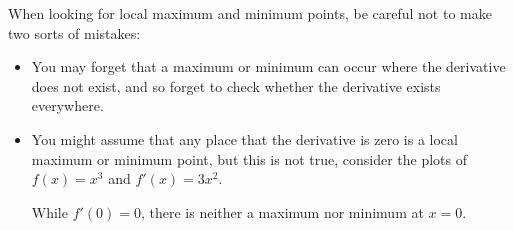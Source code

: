 \documentclass{ximera}
\begin{document}
\begin{warning} 
When looking for local maximum and minimum points, be careful not to
make two sorts of mistakes: 
\begin{itemize}
\item You may forget that a maximum or minimum can occur where the
  derivative does not exist, and so forget to check whether the
  derivative exists everywhere. 
\item You might assume that any place that the derivative is zero is a
  local maximum or minimum point, but this is not true, consider the
  plots of $f(x) = x^3$ and $f'(x) = 3x^2$.
\begin{image}
\end{image}
While $f'(0)=0$, there is neither a maximum nor minimum at $x=0$.
\end{itemize}
\end{warning}
\end{document}
